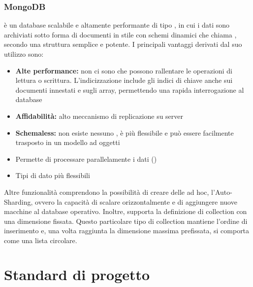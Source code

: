 \documentclass[12pt,a4paper]{article}
\begin{document}
\subsubsection{MongoDB}\label{mongodb}
 è un database   scalabile e altamente performante di tipo , in cui i dati sono archiviati sotto forma di documenti in stile  con
schemi dinamici che  chiama , secondo una struttura semplice e potente.
I principali vantaggi derivati dal suo utilizzo sono:
\begin{itemize}
	\item \textbf{Alte performance:} non ci sono  che possono rallentare le operazioni di lettura o scrittura. L’indicizzazione include gli indici di chiave anche sui documenti innestati e sugli array, permettendo una rapida interrogazione al database
	\item \textbf{Affidabilità:} alto meccanismo di replicazione su server
	\item \textbf{Schemaless:} non esiste nessuno , è più flessibile e può essere facilmente trasposto in un modello ad oggetti
	\item Permette di processare parallelamente i dati ()
	\item Tipi di dato più flessibili
\end{itemize}
Altre funzionalità comprendono la possibilità di creare delle  ad hoc, l’Auto-Sharding, ovvero la capacità di scalare orizzontalmente e di aggiungere nuove macchine al database operativo.
Inoltre,  supporta la definizione di collection con una dimensione fissata. Questo particolare tipo di collection mantiene l’ordine di inserimento e, una volta raggiunta la dimensione massima prefissata, si comporta come una lista circolare.

\newpage
\section{Standard di progetto}

\end{document}
